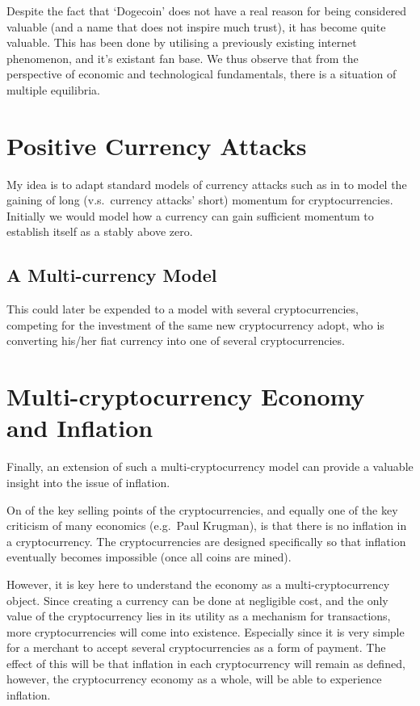 \begin{refsection}
Despite the fact that `Dogecoin' does not have a real reason for being considered valuable
(and a name that does not inspire much trust), it has become quite valuable.
This has been done by utilising a previously existing internet phenomenon, and it's existant fan base.
We thus observe that from the perspective of economic and technological fundamentals,
there is a situation of multiple equilibria.

\section{Positive Currency Attacks}
My idea is to adapt standard models of currency attacks such as in 
\textcite{obstfeld1986rational,obstfeld1995logic,obstfeld1996models}
to model the gaining of long (v.s.~currency attacks' short) momentum for cryptocurrencies.
Initially we would model how a currency can gain sufficient momentum to establish itself as a stably above zero.

\subsection{A Multi-currency Model}
This could later be expended to a model with several cryptocurrencies,
competing for the investment of the same new cryptocurrency adopt,
who is converting his/her fiat currency into one of several cryptocurrencies.

\section{Multi-cryptocurrency Economy and Inflation}
Finally, an extension of such a multi-cryptocurrency model can provide a valuable insight into the issue of inflation.

On of the key selling points of the cryptocurrencies, and equally one of the key criticism of many economics
(e.g.~Paul Krugman), is that there is no inflation in a cryptocurrency.
The cryptocurrencies are designed specifically so that inflation eventually becomes impossible (once all coins are mined).

However, it is key here to understand the economy as a multi-cryptocurrency object.
Since creating a currency can be done at negligible cost,
and the only value of the cryptocurrency lies in its utility as a mechanism for transactions,
more cryptocurrencies will come into existence.
Especially since it is very simple for a merchant to accept several cryptocurrencies as a form of payment.
The effect of this will be that inflation in each cryptocurrency will remain as defined,
however, the cryptocurrency economy as a whole, will be able to experience inflation.


\end{refsection}
